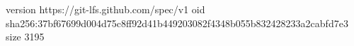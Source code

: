 version https://git-lfs.github.com/spec/v1
oid sha256:37bf67699d004d75c8ff92d41b449203082f4348b055b832428233a2cabfd7e3
size 3195
